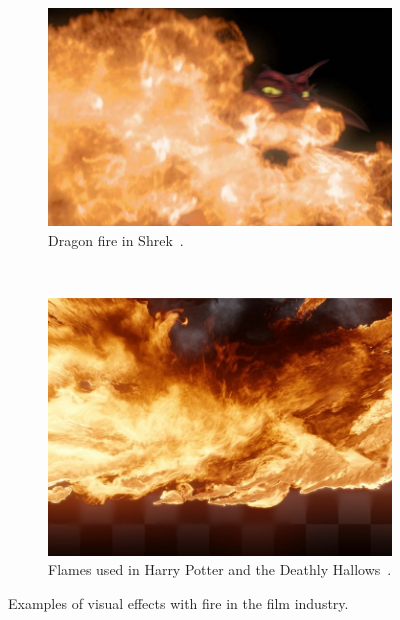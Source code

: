 \begin{figure}[htpb!]
\begin{subfigure}[t]{0.5\textwidth}
                \includegraphics[width=\textwidth]{img/lamorlette_2002}
                \caption{Dragon fire in Shrek~\cite{Lamorlette:2002}.}
                \label{fig:lamorlette_2002}
        \end{subfigure}
        ~ %
        \begin{subfigure}[b]{0.5\textwidth}
                \includegraphics[width=\textwidth]{img/horvarth_2009}
                \caption{Flames used in Harry Potter and the Deathly Hallows~\cite{Horvath:2009}.}
                \label{fig:horvarth_2009}
        \end{subfigure}
        \caption{Examples of visual effects with fire in the film industry.}
\end{figure}


